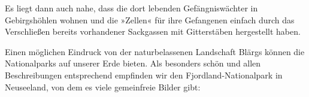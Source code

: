 \cleardoubleoddpage

%

\cleardoubleoddpage

%

\cleardoubleoddpage

%

\cleardoubleoddpage

%

\cleardoubleoddpage

%

\cleardoubleoddpage

%

\cleardoubleoddpage

%

\cleardoubleoddpage

%

\cleardoubleoddpage

%

\cleardoubleoddpage

%

\cleardoubleoddpage

Es liegt dann auch nahe, dass die dort lebenden Gefängniswächter in Gebirgshöhlen wohnen und die »Zellen« für ihre Gefangenen einfach durch das Verschließen bereits vorhandener Sackgassen mit Gitterstäben hergestellt haben.

Einen möglichen Eindruck von der naturbelassenen Landschaft Blärgs können die Nationalparks auf unserer Erde bieten. Als besonders schön und allen Beschreibungen entsprechend empfinden wir den Fjordland-Nationalpark in Neuseeland, von dem es viele gemeinfreie Bilder gibt:

\cleardoubleoddpage

%

\cleardoubleoddpage

%

